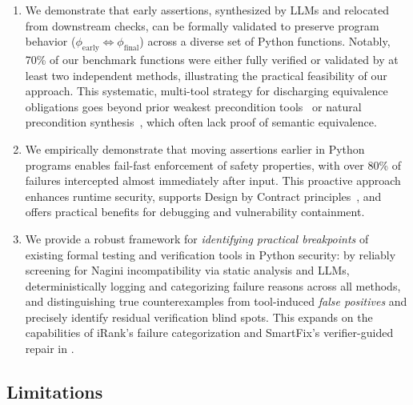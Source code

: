 \documentclass[8pt]{extarticle}
\begin{document}
\begin{enumerate}
    \item We demonstrate that early assertions, synthesized by LLMs and relocated from downstream checks, can be formally validated to preserve program behavior ($\phi_{\text{early}} \Leftrightarrow \phi_{\text{final}}$) across a diverse set of Python functions. Notably, 70\% of our benchmark functions were either fully verified or validated by at least two independent methods, illustrating the practical feasibility of our approach. This systematic, multi-tool strategy for discharging equivalence obligations goes beyond prior weakest precondition tools~\cite{rak-amnouykit2023weakest, baudart2022raise} or natural precondition synthesis~\cite{Dinella2024-NatPrecondition}, which often lack proof of semantic equivalence.
    \item We empirically demonstrate that moving assertions earlier in Python programs enables fail-fast enforcement of safety properties, with over 80\% of failures intercepted almost immediately after input. This proactive approach enhances runtime security, supports Design by Contract principles~\cite{schneider2000, meyer1992}, and offers practical benefits for debugging and vulnerability containment.
    \item We provide a robust framework for \textit{identifying practical breakpoints} of existing formal testing and verification tools in Python security: by reliably screening for Nagini incompatibility via static analysis and LLMs, deterministically logging and categorizing failure reasons across all methods, and distinguishing true counterexamples from tool-induced \textit{false positives} and precisely identify residual verification blind spots. This expands on the capabilities of iRank's failure categorization and SmartFix's verifier-guided repair in \cite{Chakraborty2023-iRank, SoOh2023SmartFix}.
\end{enumerate}

\subsection{Limitations}

\end{document}
